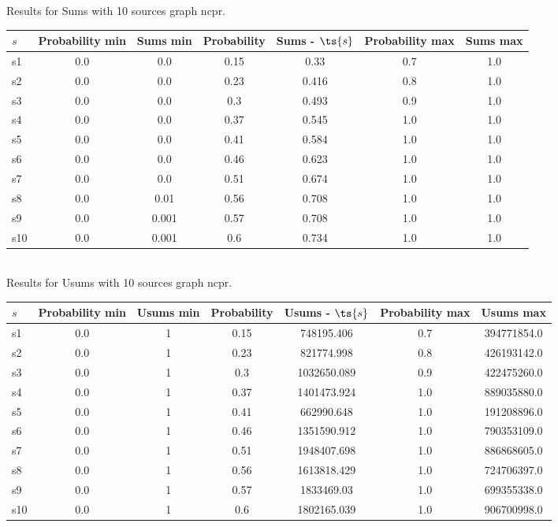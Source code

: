 \documentclass{article}
\begin{document}
\noindent Results for Sums with 10 sources graph ncpr.

\noindent\begin{tabular}{|l|c|c|c|c|c|c|}
\hline
$s$& Probability min & Sums min & Probability & Sums - $\ts{s}$ & Probability max & Sums max\\
\hline
s1 &0.0 & 0.0 & 0.15 & 0.33 & 0.7 & 1.0\\
\hline
s2 &0.0 & 0.0 & 0.23 & 0.416 & 0.8 & 1.0\\
\hline
s3 &0.0 & 0.0 & 0.3 & 0.493 & 0.9 & 1.0\\
\hline
s4 &0.0 & 0.0 & 0.37 & 0.545 & 1.0 & 1.0\\
\hline
s5 &0.0 & 0.0 & 0.41 & 0.584 & 1.0 & 1.0\\
\hline
s6 &0.0 & 0.0 & 0.46 & 0.623 & 1.0 & 1.0\\
\hline
s7 &0.0 & 0.0 & 0.51 & 0.674 & 1.0 & 1.0\\
\hline
s8 &0.0 & 0.01 & 0.56 & 0.708 & 1.0 & 1.0\\
\hline
s9 &0.0 & 0.001 & 0.57 & 0.708 & 1.0 & 1.0\\
\hline
s10 &0.0 & 0.001 & 0.6 & 0.734 & 1.0 & 1.0\\
\hline
\end{tabular}\\

\noindent Results for Usums with 10 sources graph ncpr.

\noindent\begin{tabular}{|l|c|c|c|c|c|c|}
\hline
$s$& Probability min & Usums min & Probability & Usums - $\ts{s}$ & Probability max & Usums max\\
\hline
s1 &0.0 & 1 & 0.15 & 748195.406 & 0.7 & 394771854.0\\
\hline
s2 &0.0 & 1 & 0.23 & 821774.998 & 0.8 & 426193142.0\\
\hline
s3 &0.0 & 1 & 0.3 & 1032650.089 & 0.9 & 422475260.0\\
\hline
s4 &0.0 & 1 & 0.37 & 1401473.924 & 1.0 & 889035880.0\\
\hline
s5 &0.0 & 1 & 0.41 & 662990.648 & 1.0 & 191208896.0\\
\hline
s6 &0.0 & 1 & 0.46 & 1351590.912 & 1.0 & 790353109.0\\
\hline
s7 &0.0 & 1 & 0.51 & 1948407.698 & 1.0 & 886868605.0\\
\hline
s8 &0.0 & 1 & 0.56 & 1613818.429 & 1.0 & 724706397.0\\
\hline
s9 &0.0 & 1 & 0.57 & 1833469.03 & 1.0 & 699355338.0\\
\hline
s10 &0.0 & 1 & 0.6 & 1802165.039 & 1.0 & 906700998.0\\
\hline
\end{tabular}\\
\end{document}
